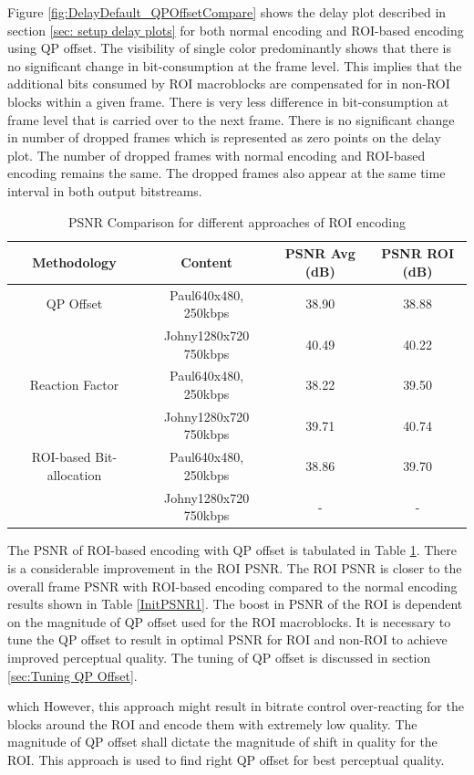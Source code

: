 \documentclass[11pt]{article} %
\begin{document}
 Figure \ref{fig:DelayDefault_QPOffsetCompare} shows the delay plot described in section \ref{sec: setup delay plots} for both normal encoding and ROI-based encoding using QP offset. The visibility of single color predominantly shows that there is no significant change in bit-consumption at the frame level. This implies that the additional bits consumed by ROI macroblocks are compensated for in non-ROI blocks within a given frame. There is very less difference in bit-consumption at frame level that is carried over to the next frame. There is no significant change in number of dropped frames which is represented as zero points on the delay plot. The number of dropped frames with normal encoding and ROI-based encoding remains the same. The dropped frames also appear at the same time interval in both output bitstreams.
 
\begin{table} [h!]
\centering
\begin{tabular}{ |c|c|c|c| }
 \hline
Methodology & Content & PSNR Avg (dB) & PSNR ROI (dB) \\
 \hline 
QP Offset & Paul640x480, 250kbps & 38.90 & 38.88 \\ 
 & Johny1280x720 750kbps & 40.49 & 40.22 \\  
 \hline
Reaction Factor & Paul640x480, 250kbps & 38.22 & 39.50 \\ 
 & Johny1280x720 750kbps & 39.71 & 40.74 \\  
 \hline
ROI-based Bit-allocation & Paul640x480, 250kbps & 38.86 & 39.70 \\ 
& Johny1280x720 750kbps & - & - \\  
\hline 
\end{tabular}
 \caption{PSNR Comparison for different approaches of ROI encoding}
 \label{AllPSNR1}
\end{table}

The PSNR of ROI-based encoding with QP offset is tabulated in Table \ref{AllPSNR1}. There is a considerable improvement in the ROI PSNR. The ROI PSNR is closer to the overall frame PSNR with ROI-based encoding compared to the normal encoding results shown in Table \ref{InitPSNR1}. The boost in PSNR of the ROI is dependent on the magnitude of QP offset used for the ROI macroblocks. It is necessary to tune the QP offset to result in optimal PSNR for ROI and non-ROI to achieve improved perceptual quality. The tuning of QP offset is discussed in section \ref{sec:Tuning QP Offset}.


\iffalse
which However, this approach might result in bitrate control over-reacting for the blocks around the ROI and encode them with extremely low quality. The magnitude of QP offset shall dictate the magnitude of shift in quality for the ROI. This approach is used to find right QP offset for best perceptual quality.\\
\end{document}
